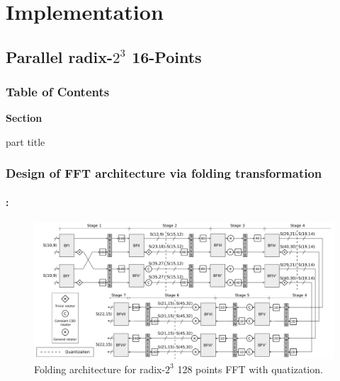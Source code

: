 \section{Implementation}
\subsection{Parallel radix-$2^3$ 16-Points}
\begin{frame}
  \frametitle{\textbf{Table of Contents}}
  \begin{center}
    {\vspace{-1.5cm}\Large \textbf{Section \thesection}\vspace{0.5cm}}
    \begin{beamercolorbox}[
      sep=8pt,center]{part title}
      \textbf{\insertsection}
    \end{beamercolorbox}
  \end{center}
\end{frame}


\begin{frame}
	\frametitle{\textbf{Design of FFT architecture via folding transformation}}
	\framesubtitle{\secname : \subsecname}
		\begin{figure}[h!] \centering
		   	\includegraphics[width=0.95\paperwidth]{./image/folding-128-quant.pdf}
		   	\caption{ \tiny Folding architecture for radix-$2^3$  128 points FFT with quatization.}
		\end{figure}  	
\end{frame}


